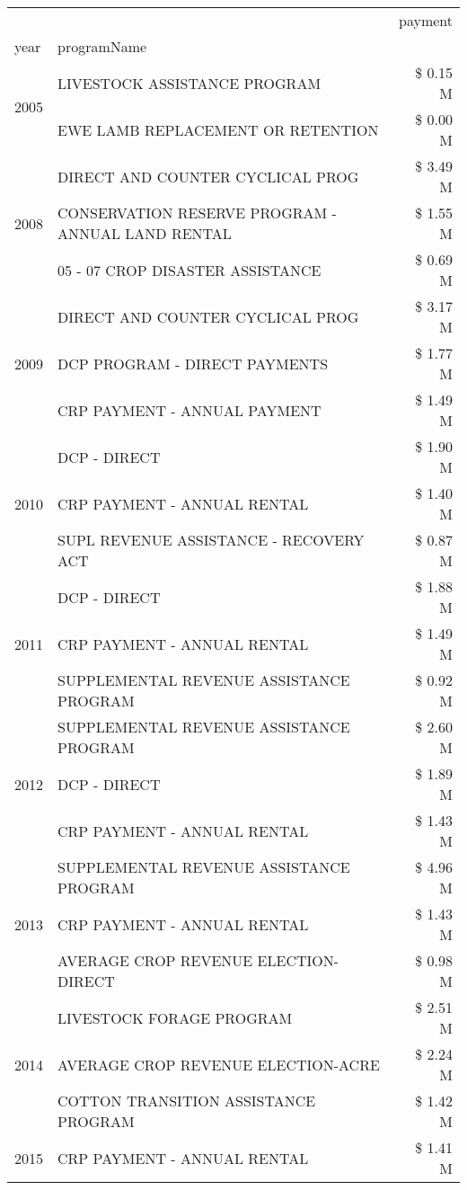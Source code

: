 \begin{tabular}{llr}
\toprule
 &  & payment \\
year & programName &  \\
\midrule
\multirow[t]{2}{*}{2005} & LIVESTOCK ASSISTANCE PROGRAM & \$ 0.15 M \\
 & EWE LAMB REPLACEMENT OR RETENTION & \$ 0.00 M \\
\cline{1-3}
\multirow[t]{3}{*}{2008} & DIRECT AND COUNTER CYCLICAL PROG & \$ 3.49 M \\
 & CONSERVATION RESERVE PROGRAM - ANNUAL LAND RENTAL & \$ 1.55 M \\
 & 05 - 07 CROP DISASTER ASSISTANCE & \$ 0.69 M \\
\cline{1-3}
\multirow[t]{3}{*}{2009} & DIRECT AND COUNTER CYCLICAL PROG & \$ 3.17 M \\
 & DCP PROGRAM - DIRECT PAYMENTS & \$ 1.77 M \\
 & CRP PAYMENT - ANNUAL PAYMENT & \$ 1.49 M \\
\cline{1-3}
\multirow[t]{3}{*}{2010} & DCP - DIRECT & \$ 1.90 M \\
 & CRP PAYMENT - ANNUAL RENTAL & \$ 1.40 M \\
 & SUPL REVENUE ASSISTANCE - RECOVERY ACT & \$ 0.87 M \\
\cline{1-3}
\multirow[t]{3}{*}{2011} & DCP - DIRECT & \$ 1.88 M \\
 & CRP PAYMENT - ANNUAL RENTAL & \$ 1.49 M \\
 & SUPPLEMENTAL REVENUE ASSISTANCE PROGRAM & \$ 0.92 M \\
\cline{1-3}
\multirow[t]{3}{*}{2012} & SUPPLEMENTAL REVENUE ASSISTANCE PROGRAM & \$ 2.60 M \\
 & DCP - DIRECT & \$ 1.89 M \\
 & CRP PAYMENT - ANNUAL RENTAL & \$ 1.43 M \\
\cline{1-3}
\multirow[t]{3}{*}{2013} & SUPPLEMENTAL REVENUE ASSISTANCE PROGRAM & \$ 4.96 M \\
 & CRP PAYMENT - ANNUAL RENTAL & \$ 1.43 M \\
 & AVERAGE CROP REVENUE ELECTION-DIRECT & \$ 0.98 M \\
\cline{1-3}
\multirow[t]{3}{*}{2014} & LIVESTOCK FORAGE PROGRAM & \$ 2.51 M \\
 & AVERAGE CROP REVENUE ELECTION-ACRE & \$ 2.24 M \\
 & COTTON TRANSITION ASSISTANCE PROGRAM & \$ 1.42 M \\
\cline{1-3}
\multirow[t]{3}{*}{2015} & CRP PAYMENT - ANNUAL RENTAL & \$ 1.41 M \\

\end{tabular}
